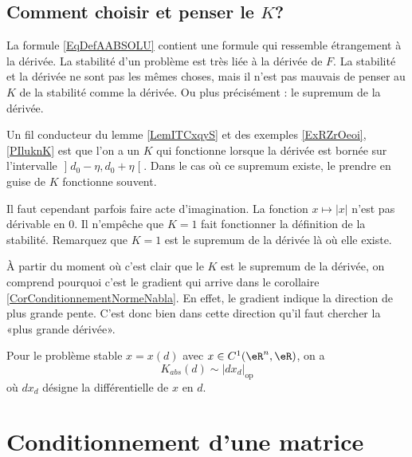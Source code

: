 \subsection{Comment choisir et penser le $K$?}

La formule \eqref{EqDefAABSOLU} contient une formule qui ressemble étrangement à la dérivée. La stabilité d'un problème est très liée à la dérivée de $F$. La stabilité et la dérivée ne sont pas les mêmes choses, mais il n'est pas mauvais de penser au $K$ de la stabilité comme la dérivée. Ou plus précisément : le supremum de la dérivée.

Un fil conducteur du lemme \ref{LemITCxqyS} et des exemples \ref{ExRZrOeoi}, \ref{PIluknK} est que l'on a un $K$ qui fonctionne lorsque la dérivée est bornée sur l'intervalle $\mathopen] d_0-\eta , d_0+\eta \mathclose[$. Dans le cas où ce supremum existe, le prendre en guise de $K$ fonctionne souvent.

Il faut cependant parfois faire acte d'imagination. La fonction $x\mapsto| x |$ n'est pas dérivable en $0$. Il n'empêche que $K=1$ fait fonctionner la définition de la stabilité. Remarquez que $K=1$ est le supremum de la dérivée là où elle existe.

À partir du moment où c'est clair que le $K$ est le supremum de la dérivée, on comprend pourquoi c'est le gradient qui arrive dans le corollaire \ref{CorConditionnementNormeNabla}. En effet, le gradient indique la direction de plus grande pente. C'est donc bien dans cette direction qu'il faut chercher la «plus grande dérivée».

\begin{proposition}
	Pour le problème stable $x=x(d)$ avec $x\in C^1(\eR^n,\eR)$, on a
	\begin{equation}
		K_{abs}(d)\sim|dx_d|_{\mbox{op}}
	\end{equation}
	où \( dx_d\) désigne la différentielle de $x$ en $d$.
\end{proposition}

\section{Conditionnement d'une matrice}

